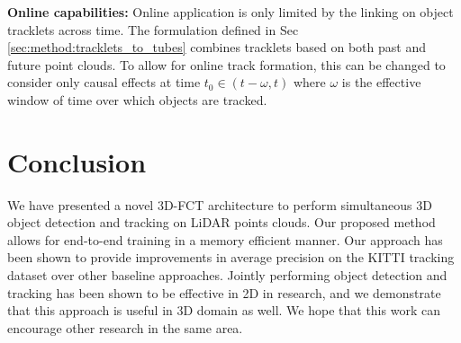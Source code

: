 \documentclass[10pt,twocolumn,letterpaper]{article}
\begin{document}
\textbf{Online capabilities:} Online application is only limited by the linking on object tracklets across time. The formulation defined in Sec \ref{sec:method:tracklets_to_tubes} combines tracklets based on both past and future point clouds. To allow for online track formation, this can be changed to consider only causal effects at time $t_0\in(t-\omega, t)$ where $\omega$ is the effective window of time over which objects are tracked.

\section{Conclusion}\label{sec:conclusion}
We have presented a novel 3D-FCT architecture to perform simultaneous 3D object detection and tracking on LiDAR points clouds. Our proposed method allows for end-to-end training in a memory efficient manner. Our approach has been shown to provide improvements in average precision on the KITTI tracking dataset over other baseline approaches. Jointly performing object detection and tracking has been shown to be effective in 2D in research, and we demonstrate that this approach is useful in 3D domain as well. We hope that this work can encourage other research in the same area.




{\small


}
\end{document}
